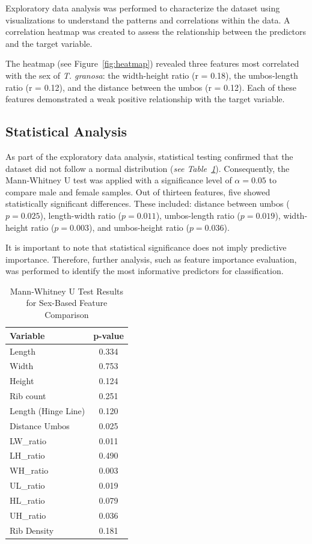 Exploratory data analysis was performed to characterize the dataset using visualizations to understand the patterns and correlations within the data. A correlation heatmap was created to assess the relationship between the predictors and the target variable.

The heatmap (see Figure~\ref{fig:heatmap}) revealed three features most correlated with the sex of \textit{T. granosa}: the width-height ratio (r = 0.18), the umbos-length ratio (r = 0.12), and the distance between the umbos (r = 0.12). Each of these features demonstrated a weak positive relationship with the target variable. 

\subsection{Statistical Analysis}

As part of the exploratory data analysis, statistical testing confirmed that the dataset did not follow a normal distribution (\textit{see Table~\ref{tab:mann-whitney}}). Consequently, the Mann-Whitney U test was applied with a significance level of $\alpha = 0.05$ to compare male and female samples. Out of thirteen features, five showed statistically significant differences. These included: distance between umbos ($p = 0.025$), length-width ratio ($p = 0.011$), umbos-length ratio ($p = 0.019$), width-height ratio ($p = 0.003$), and umbos-height ratio ($p = 0.036$). 

It is important to note that statistical significance does not imply predictive importance. Therefore, further analysis, such as feature importance evaluation, was performed to identify the most informative predictors for classification.

\begin{table}[H]
	\centering
	\small %
	\begin{tabular}{lc}
		\hline
		\textbf{Variable} & \textbf{p-value} \\ \hline
		Length & 0.334 \\
		Width & 0.753 \\
		Height & 0.124 \\
		Rib count & 0.251 \\
		Length (Hinge Line) & 0.120 \\
		Distance Umbos & 0.025 \\
		LW\_ratio & 0.011 \\
		LH\_ratio & 0.490 \\
		WH\_ratio & 0.003 \\
		UL\_ratio & 0.019 \\
		HL\_ratio & 0.079 \\
		UH\_ratio & 0.036 \\
		Rib Density & 0.181 \\ \hline
	\end{tabular}
	\caption{Mann-Whitney U Test Results for Sex-Based Feature Comparison}
	\label{tab:mann-whitney}
\end{table}

